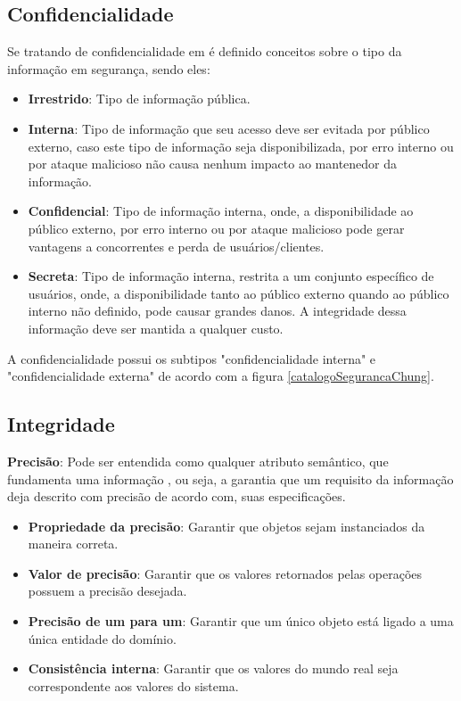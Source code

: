 \subsection{Confidencialidade}

Se tratando de confidencialidade em \cite{reis10classificaccao} é definido conceitos sobre o tipo da informação em segurança, sendo eles: 

\begin{itemize}
	\item \textbf{Irrestrido}: Tipo de informação pública. 
	
	\item \textbf{Interna}: Tipo de informação que seu acesso deve ser evitada por público externo, caso este tipo de informação seja disponibilizada, por erro interno ou por ataque malicioso não causa nenhum impacto ao mantenedor da informação.
	
	\item \textbf{Confidencial}: Tipo de informação interna, onde, a disponibilidade ao público externo, por erro interno ou por ataque malicioso pode gerar vantagens a concorrentes e perda de usuários/clientes. 
	
	\item \textbf{Secreta}: Tipo de informação interna, restrita a um conjunto específico de usuários, onde, a disponibilidade tanto ao público externo quando ao público interno não definido, pode causar grandes danos. A integridade dessa informação deve ser mantida a qualquer custo.
\end{itemize} 

A confidencialidade possui os subtipos "confidencialidade interna" e "confidencialidade externa" de acordo com a figura \ref{catalogoSegurancaChung}.
 

\subsection{Integridade}
 

\textbf{Precisão}: Pode ser entendida como qualquer atributo semântico, que fundamenta uma informação \cite{chung2012non}, ou seja, a garantia que um requisito da informação deja descrito com precisão de acordo com, suas especificações. 

\begin{itemize}
	\item \textbf{Propriedade da precisão}: Garantir que objetos sejam instanciados da maneira correta. 
	
	\item \textbf{Valor de precisão}: Garantir que os valores retornados pelas operações possuem a precisão desejada.
	
	\item \textbf{Precisão de um para um}: Garantir que um único objeto está ligado a uma única entidade do domínio. 
	
	\item \textbf{Consistência interna}: Garantir que os valores do mundo real seja correspondente aos valores do sistema.
\end{itemize}


